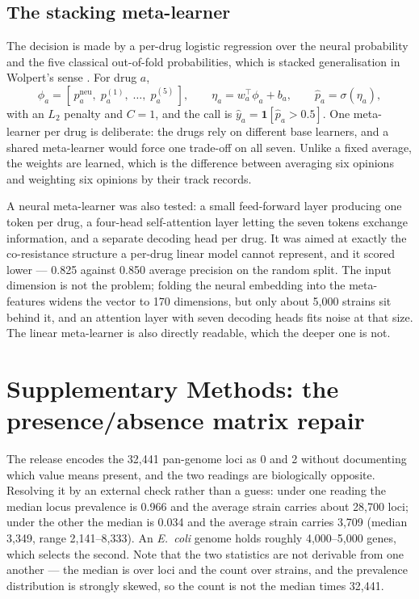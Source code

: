 \documentclass[11pt]{article}
\newcommand{\Ecoli}{\textit{E.~coli}}
\begin{document}
\subsection{The stacking meta-learner}
The decision is made by a per-drug logistic regression over the neural probability and the five
classical out-of-fold probabilities, which is stacked generalisation in Wolpert's sense
\cite{wolpert1992stacked}. For drug $a$,
\begin{equation}
\phi_a = \left[\,p^{\mathrm{neu}}_a,\; p^{(1)}_a,\; \dots,\; p^{(5)}_a\,\right],
\qquad
\eta_a = w_a^\top \phi_a + b_a,
\qquad
\hat{p}_a = \sigma(\eta_a),
\label{eq:meta}
\end{equation}
with an $L_2$ penalty and $C = 1$, and the call is $\hat{y}_a = \mathbf{1}[\hat{p}_a > 0.5]$. One
meta-learner per drug is deliberate: the drugs rely on different base learners, and a shared
meta-learner would force one trade-off on all seven. Unlike a fixed average, the weights are
learned, which is the difference between averaging six opinions and weighting six opinions by their
track records.

A neural meta-learner was also tested: a small feed-forward layer producing one token per drug, a
four-head self-attention layer letting the seven tokens exchange information, and a separate
decoding head per drug. It was aimed at exactly the co-resistance structure a per-drug linear model
cannot represent, and it scored lower --- 0.825 against 0.850 average precision on the random split.
The input dimension is not the problem; folding the neural embedding into the meta-features widens
the vector to 170 dimensions, but only about 5,000 strains sit behind it, and an attention layer
with seven decoding heads fits noise at that size. The linear meta-learner is also directly
readable, which the deeper one is not.

\section{Supplementary Methods: the presence/absence matrix repair}

The release encodes the 32,441 pan-genome loci as 0 and 2 without documenting which value means
present, and the two readings are biologically opposite. Resolving it by an external check rather
than a guess: under one reading the median locus prevalence is 0.966 and the average strain carries
about 28,700 loci; under the other the median is 0.034 and the average strain carries 3,709 (median
3,349, range 2,141--8,333). An \Ecoli{} genome holds roughly 4,000--5,000 genes, which selects the
second. Note that the two statistics are not derivable from one another --- the median is over loci
and the count over strains, and the prevalence distribution is strongly skewed, so the count is not
the median times 32,441.
\end{document}
